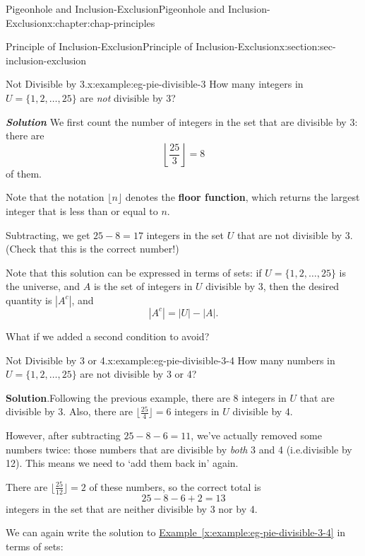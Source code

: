 \documentclass[oneside,10pt,]{book}
\newcommand{\blocktitlefont}{\relax}
\newcommand{\xreffont}{\relax}
\newcommand{\alert}[1]{\textbf{\textit{#1}}}
\newcommand{\terminology}[1]{\textbf{#1}}
\numberwithin{equation}{section}
\begin{document}
\begin{chapterptx}{Pigeonhole and Inclusion-Exclusion}{}{Pigeonhole and Inclusion-Exclusion}{}{}{x:chapter:chap-principles}
\begin{sectionptx}{Principle of Inclusion-Exclusion}{}{Principle of Inclusion-Exclusion}{}{}{x:section:sec-inclusion-exclusion}
\begin{example}{Not Divisible by 3.}{x:example:eg-pie-divisible-3}
How many integers in \(U = \{1,2,\ldots,25\}\) are \emph{not} divisible by 3?%
\par
\alert{Solution} \label{g:notation:id530051} We first count the number of integers in the set that are divisible by 3: there are%
\begin{equation*}
\left\lfloor \frac{25}{3}\right\rfloor = 8
\end{equation*}
of them.%
\par
Note that the notation \(\lfloor n \rfloor\) denotes the \terminology{floor function}, which returns the largest integer that is less than or equal to \(n\).%
\par
Subtracting, we get \(25 - 8 = 17\) integers in the set \(U\) that are not divisible by 3. (Check that this is the correct number!)%
\end{example}
Note that this solution can be expressed in terms of sets: if \(U = \{1,2,\ldots,25\}\) is the universe, and \(A\) is the set of integers in \(U\) divisible by 3, then the desired quantity is \(|A^c|\), and%
\begin{equation*}
|A^c| = |U| - |A|\text{.}
\end{equation*}
%
\par
What if we added a second condition to avoid?%
\begin{example}{Not Divisible by 3 or 4.}{x:example:eg-pie-divisible-3-4}%
How many numbers in \(U = \{1,2,\ldots,25\}\) are not divisible by 3 or 4?%
\par\smallskip%
\noindent\textbf{\blocktitlefont Solution}.\hypertarget{g:solution:id530129}{}\quad{}Following the previous example, there are \(8\) integers in \(U\) that are divisible by 3. Also, there are \(\lfloor \frac{25}{4} \rfloor = 6\) integers in \(U\) divisible by 4.%
\par
However, after subtracting \(25 - 8 - 6 = 11\), we've actually removed some numbers twice: those numbers that are divisible by \emph{both} 3 and 4 (i.e.\@ divisible by 12). This means we need to `add them back in' again.%
\par
There are \(\lfloor \frac{25}{12} \rfloor = 2\) of these numbers, so the correct total is%
\begin{equation*}
25 - 8 - 6 + 2 = 13
\end{equation*}
integers in the set that are neither divisible by 3 nor by 4.%
\end{example}
We can again write the solution to \hyperref[x:example:eg-pie-divisible-3-4]{Example~{\xreffont\ref{x:example:eg-pie-divisible-3-4}}} in terms of sets:%

\end{sectionptx}
\end{chapterptx}
\end{document}
